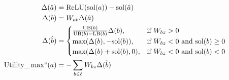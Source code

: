 {\begin{align*}
	\Delta(\hat{a}) &= \mathrm{ReLU}(\mathrm{sol}(a))-\mathrm{sol}(\hat{a})\\
	\Delta(b) &= W_{ab}\Delta(\hat{a})\\
	\Delta(\hat{b}) &=
	\begin{cases}
		\frac{\mathrm{UB}(b)}{\mathrm{UB}(b)-\mathrm{LB}(b)}\Delta(b),  &\text{if }W_{bz} > 0\\
		\max(\Delta(b),-\mathrm{sol}(b)),  &\text{if }  W_{bz} < 0 \text{ and } \mathrm{sol}(b)\geq0\\
		\max(\Delta(b)+\mathrm{sol}(b),0),  &\text{if }  W_{bz} < 0 \text{ and } \mathrm{sol}(b)<0		 
	\end{cases}\\
	\mathrm{Utility}\_\max\nolimits^z(a) &= -\sum_{b \in \ell} W_{bz} \Delta(\hat{b})
\end{align*}

}


